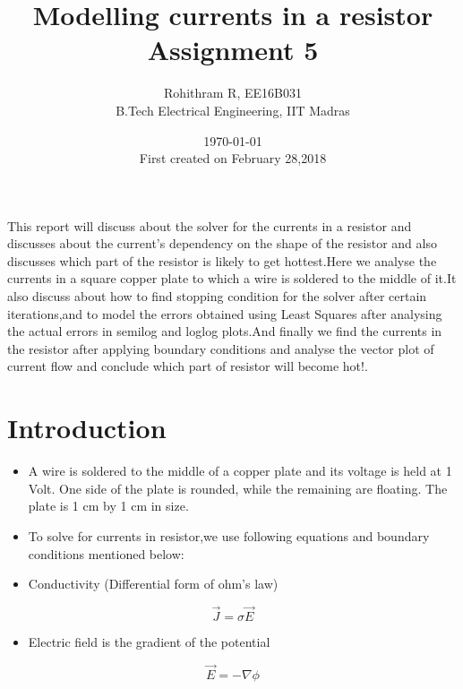 \documentclass[a4paper,10pt]{article}
\title{Modelling currents in a resistor \\ Assignment 5}
\author{Rohithram R, EE16B031 \\ B.Tech Electrical Engineering, IIT Madras}
\date{\today \\ First created on February 28,2018}
\providecommand{\tightlist}{%
      \setlength{\itemsep}{0pt}\setlength{\parskip}{0pt}}
\begin{document}
    
    
    \maketitle
    
    

    
\begin{abstract}
\end{abstract}
 This report will discuss about the solver for the currents in a
resistor and discusses about the current's dependency on the shape of
the resistor and also discusses which part of the resistor is likely to
get hottest.Here we analyse the currents in a square copper plate to
which a wire is soldered to the middle of it.It also discuss about how
to find stopping condition for the solver after certain iterations,and
to model the errors obtained using Least Squares after analysing the
actual errors in semilog and loglog plots.And finally we find the
currents in the resistor after applying boundary conditions and analyse
the vector plot of current flow and conclude which part of resistor will
become hot!.

    \section{Introduction}\label{introduction}

\begin{itemize}
\tightlist
\item
  A wire is soldered to the middle of a copper plate and its voltage is
  held at 1 Volt. One side of the plate is rounded, while the remaining
  are floating. The plate is 1 cm by 1 cm in size.
\item
  To solve for currents in resistor,we use following equations and
  boundary conditions mentioned below:
\item
  Conductivity (Differential form of ohm's law)
\end{itemize}

\begin{equation}
\vec{J} = \sigma\vec{E}
   \end{equation}

\begin{itemize}
\tightlist
\item
  Electric field is the gradient of the potential
\end{itemize}

\begin{equation}
\vec{E} = -\nabla{\phi}
   \end{equation}
\end{document}
